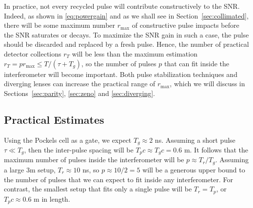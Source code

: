 In practice, not every recycled pulse will contribute constructively to the SNR.  Indeed, as shown in \eqref{eq:powergain} and as we shall see in Section~\ref{sec:collimated}, there will be some maximum number $r_{\text{max}}$ of constructive pulse impacts before the SNR saturates or decays.  To maximize the SNR gain in such a case, the pulse should be discarded and replaced by a fresh pulse.  Hence, the number of practical detector collections $r_T$ will be less than the maximum estimation $r_T = p r_{\text{max}} \le T / (\tau + T_g)$, so the number of pulses $p$ that can fit inside the interferometer will become important.  Both pulse stabilization techniques and diverging lenses can increase the practical range of $r_{\text{max}}$, which we will discuss in Sections~\ref{sec:parity}, \ref{sec:zeno} and \ref{sec:diverging}.


\subsection{Practical Estimates}\label{sec:snrestimates}
Using the Pockels cell as a gate, we expect $T_g \approx 2$ ns.  Assuming a short pulse $\tau \ll T_g$, then the inter-pulse spacing will be $T_p c \approx T_g c = 0.6$ m.  It follows that the maximum number of pulses inside the interferometer will be $p \approx T_r / T_g$.  Assuming a large $3$m setup, $T_r \approx 10$ ns, so $p \approx 10 / 2 = 5$ will be a generous upper bound to the number of pulses that we can expect to fit inside any interferometer.  For contrast, the smallest setup that fits only a single pulse will be $T_r = T_p$, or $T_p c \approx 0.6$ m in length.

